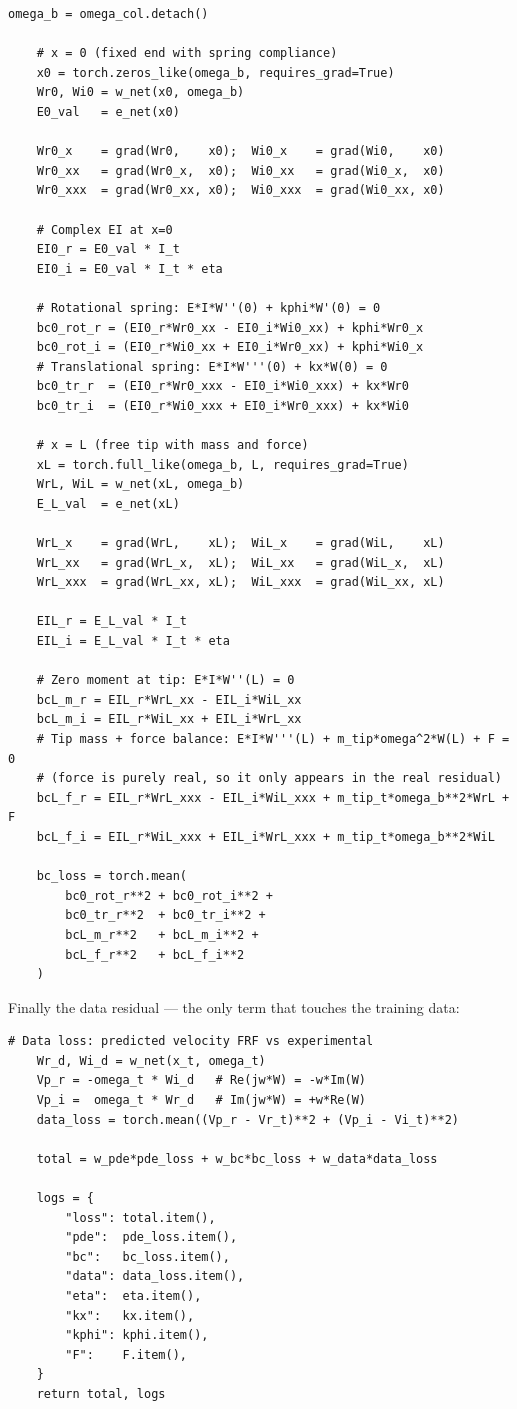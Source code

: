 \documentclass[11pt,a4paper]{article}
\begin{document}
\begin{lstlisting}[caption={PINN loss: boundary residuals}]
    omega_b = omega_col.detach()

    # x = 0 (fixed end with spring compliance)
    x0 = torch.zeros_like(omega_b, requires_grad=True)
    Wr0, Wi0 = w_net(x0, omega_b)
    E0_val   = e_net(x0)

    Wr0_x    = grad(Wr0,    x0);  Wi0_x    = grad(Wi0,    x0)
    Wr0_xx   = grad(Wr0_x,  x0);  Wi0_xx   = grad(Wi0_x,  x0)
    Wr0_xxx  = grad(Wr0_xx, x0);  Wi0_xxx  = grad(Wi0_xx, x0)

    # Complex EI at x=0
    EI0_r = E0_val * I_t
    EI0_i = E0_val * I_t * eta

    # Rotational spring: E*I*W''(0) + kphi*W'(0) = 0
    bc0_rot_r = (EI0_r*Wr0_xx - EI0_i*Wi0_xx) + kphi*Wr0_x
    bc0_rot_i = (EI0_r*Wi0_xx + EI0_i*Wr0_xx) + kphi*Wi0_x
    # Translational spring: E*I*W'''(0) + kx*W(0) = 0
    bc0_tr_r  = (EI0_r*Wr0_xxx - EI0_i*Wi0_xxx) + kx*Wr0
    bc0_tr_i  = (EI0_r*Wi0_xxx + EI0_i*Wr0_xxx) + kx*Wi0

    # x = L (free tip with mass and force)
    xL = torch.full_like(omega_b, L, requires_grad=True)
    WrL, WiL = w_net(xL, omega_b)
    E_L_val  = e_net(xL)

    WrL_x    = grad(WrL,    xL);  WiL_x    = grad(WiL,    xL)
    WrL_xx   = grad(WrL_x,  xL);  WiL_xx   = grad(WiL_x,  xL)
    WrL_xxx  = grad(WrL_xx, xL);  WiL_xxx  = grad(WiL_xx, xL)

    EIL_r = E_L_val * I_t
    EIL_i = E_L_val * I_t * eta

    # Zero moment at tip: E*I*W''(L) = 0
    bcL_m_r = EIL_r*WrL_xx - EIL_i*WiL_xx
    bcL_m_i = EIL_r*WiL_xx + EIL_i*WrL_xx
    # Tip mass + force balance: E*I*W'''(L) + m_tip*omega^2*W(L) + F = 0
    # (force is purely real, so it only appears in the real residual)
    bcL_f_r = EIL_r*WrL_xxx - EIL_i*WiL_xxx + m_tip_t*omega_b**2*WrL + F
    bcL_f_i = EIL_r*WiL_xxx + EIL_i*WrL_xxx + m_tip_t*omega_b**2*WiL

    bc_loss = torch.mean(
        bc0_rot_r**2 + bc0_rot_i**2 +
        bc0_tr_r**2  + bc0_tr_i**2 +
        bcL_m_r**2   + bcL_m_i**2 +
        bcL_f_r**2   + bcL_f_i**2
    )
\end{lstlisting}

Finally the data residual --- the only term that touches the training data:

\begin{lstlisting}[caption={PINN loss: data fit and total}]
    # Data loss: predicted velocity FRF vs experimental
    Wr_d, Wi_d = w_net(x_t, omega_t)
    Vp_r = -omega_t * Wi_d   # Re(jw*W) = -w*Im(W)
    Vp_i =  omega_t * Wr_d   # Im(jw*W) = +w*Re(W)
    data_loss = torch.mean((Vp_r - Vr_t)**2 + (Vp_i - Vi_t)**2)

    total = w_pde*pde_loss + w_bc*bc_loss + w_data*data_loss

    logs = {
        "loss": total.item(),
        "pde":  pde_loss.item(),
        "bc":   bc_loss.item(),
        "data": data_loss.item(),
        "eta":  eta.item(),
        "kx":   kx.item(),
        "kphi": kphi.item(),
        "F":    F.item(),
    }
    return total, logs
\end{lstlisting}
\end{document}
